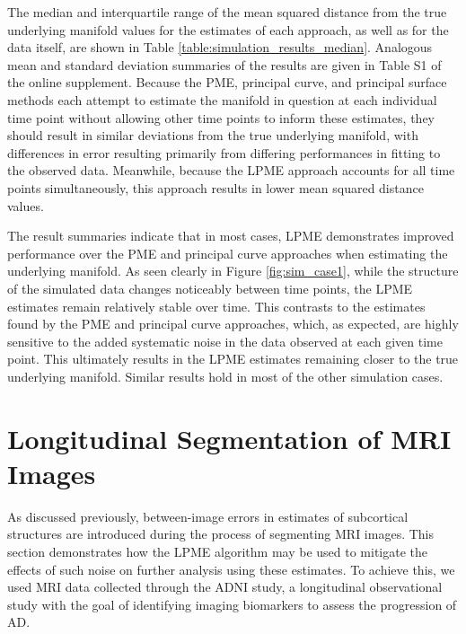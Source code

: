 \documentclass[12pt]{article}
\theoremstyle{definition}
\begin{document}
The median and interquartile range of the mean squared distance from the true underlying manifold values for the estimates of each approach, as well as for the data itself, are shown in Table \ref{table:simulation_results_median}. Analogous mean and standard deviation summaries of the results are given in Table S1 of the online supplement. Because the PME, principal curve, and principal surface methods each attempt to estimate the manifold in question at each individual time point without allowing other time points to inform these estimates, they should result in similar deviations from the true underlying manifold, with differences in error resulting primarily from differing performances in fitting to the observed data. Meanwhile, because the LPME approach accounts for all time points simultaneously, this approach results in lower mean squared distance values.

The result summaries indicate that in most cases, LPME demonstrates improved performance over the PME and principal curve approaches when estimating the underlying manifold. As seen clearly in Figure \ref{fig:sim_case1}, while the structure of the simulated data changes noticeably between time points, the LPME estimates remain relatively stable over time. This contrasts to the estimates found by the PME and principal curve approaches, which, as expected, are highly sensitive to the added systematic noise in the data observed at each given time point. This ultimately results in the LPME estimates remaining closer to the true underlying manifold. Similar results hold in most of the other simulation cases.



\section{Longitudinal Segmentation of MRI Images}\label{s:application}

As discussed previously,  between-image errors in estimates of subcortical structures are introduced during the process of segmenting MRI images. This section demonstrates how the LPME algorithm may be used to mitigate the effects of such noise on further analysis using these estimates. To achieve this, we used MRI data collected through the ADNI study, a longitudinal observational study with the goal of identifying imaging biomarkers to assess the progression of AD.
\end{document}
